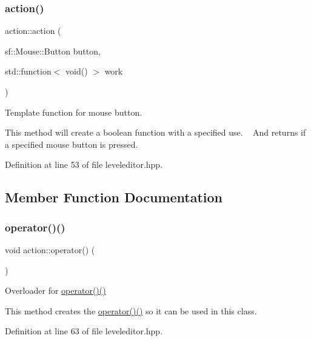 \subsubsection{\texorpdfstring{action()}{action()}\hspace{0.1cm}{\footnotesize\ttfamily [4/4]}}
{\footnotesize\ttfamily action\+::action (\begin{DoxyParamCaption}\item[{sf\+::\+Mouse\+::\+Button}]{button,  }\item[{std\+::function$<$ void() $>$}]{work }\end{DoxyParamCaption})\hspace{0.3cm}{\ttfamily [inline]}}



Template function for mouse button. 

This method will create a boolean function with a specified use. ~\newline
And returns if a specified mouse button is pressed. ~\newline


Definition at line 53 of file leveleditor.\+hpp.



\subsection{Member Function Documentation}
\mbox{\label{classaction_a92c003677656b5b3e6e58b19376e6b04}} 
\subsubsection{\texorpdfstring{operator()()}{operator()()}}
{\footnotesize\ttfamily void action\+::operator() (\begin{DoxyParamCaption}{ }\end{DoxyParamCaption})\hspace{0.3cm}{\ttfamily [inline]}}



Overloader for \hyperlink{classaction_a92c003677656b5b3e6e58b19376e6b04}{operator()()} 

This method creates the \hyperlink{classaction_a92c003677656b5b3e6e58b19376e6b04}{operator()()} so it can be used in this class. ~\newline


Definition at line 63 of file leveleditor.\+hpp.



